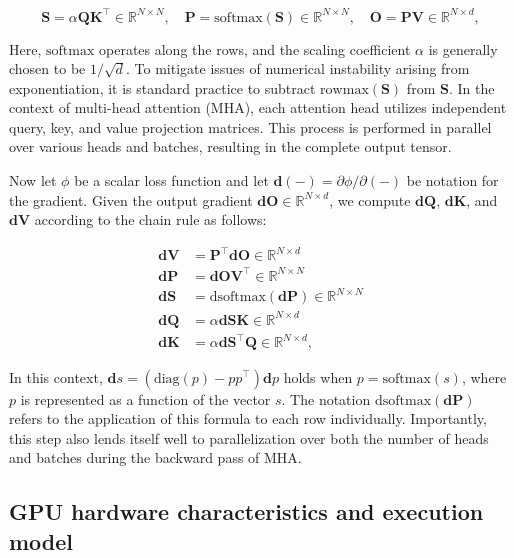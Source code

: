 \begin{equation*}
  \mathbf{S} = \alpha \mathbf{Q} \mathbf{K}^\top \in \mathbb{R}^{N \times N}, \quad \mathbf{P} = \mathrm{softmax}(\mathbf{S}) \in \mathbb{R}^{N \times N}, \quad \mathbf{O} = \mathbf{P}\mathbf{V} \in \mathbb{R}^{N \times d},
\end{equation*}

Here, $\mathrm{softmax}$ operates along the rows, and the scaling coefficient $\alpha$ is generally chosen to be $1/\sqrt{d}$. To mitigate issues of numerical instability arising from exponentiation, it is standard practice to subtract $\mathrm{rowmax}(\mathbf{S})$ from $\mathbf{S}$. In the context of multi-head attention (MHA), each attention head utilizes independent query, key, and value projection matrices. This process is performed in parallel over various heads and batches, resulting in the complete output tensor.

Now let $\phi$ be a scalar loss function and let $\mathbf{d}(-) = \partial \phi / \partial (-)$ be notation for the gradient. Given the output gradient $\mathbf{dO} \in \mathbb{R}^{N \times d}$, we compute $\mathbf{dQ}$, $\mathbf{dK}$, and $\mathbf{dV}$ according to the chain rule as follows:

\begin{align*}
  \mathbf{dV} &= \mathbf{P}^\top \mathbf{dO} \in \mathbb{R}^{N \times d} \\
  \mathbf{dP} &= \mathbf{dO} \mathbf{V}^\top \in \mathbb{R}^{N \times N} \\
  \mathbf{dS} &= \mathrm{dsoftmax} (\mathbf{dP}) \in \mathbb{R}^{N \times N} \\
  \mathbf{dQ} &= \alpha \mathbf{dS} \mathbf{K} \in \mathbb{R}^{N \times d} \\
  \mathbf{dK} &= \alpha \mathbf{dS}^\top \mathbf{Q} \in \mathbb{R}^{N \times d},
\end{align*}

In this context, $\mathbf{d}s = (\mathrm{diag}(p) - p p^\top)\mathbf{d}p$ holds when $p = \mathrm{softmax}(s)$, where $p$ is represented as a function of the vector $s$. The notation $\mathrm{dsoftmax}(\mathbf{dP})$ refers to the application of this formula to each row individually. Importantly, this step also lends itself well to parallelization over both the number of heads and batches during the backward pass of MHA.

\subsection{GPU hardware characteristics and execution model}
\label{subsec:hardware}

